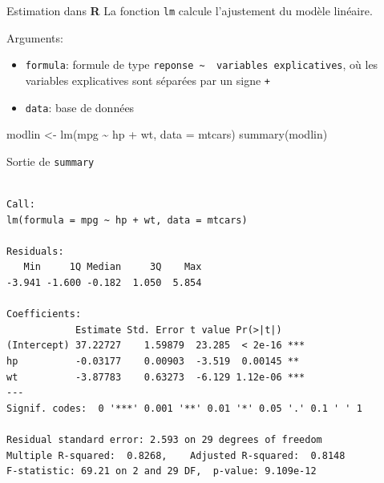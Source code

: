 \documentclass[
  ignorenonframetext,
]{beamer}
\newenvironment{Shaded}{\begin{snugshade}}{\end{snugshade}}
\newcommand{\AttributeTok}[1]{\textcolor[rgb]{0.40,0.45,0.13}{#1}}
\newcommand{\FunctionTok}[1]{\textcolor[rgb]{0.28,0.35,0.67}{#1}}
\newcommand{\NormalTok}[1]{\textcolor[rgb]{0.00,0.23,0.31}{#1}}
\newcommand{\OtherTok}[1]{\textcolor[rgb]{0.00,0.23,0.31}{#1}}
\newcommand{\SpecialCharTok}[1]{\textcolor[rgb]{0.37,0.37,0.37}{#1}}
\providecommand{\tightlist}{%
  \setlength{\itemsep}{0pt}\setlength{\parskip}{0pt}}\usepackage{longtable,booktabs,array}
\begin{document}
\begin{frame}[fragile]{Estimation dans \textbf{R}}
\label{estimation-dans-r}
La fonction \texttt{lm} calcule l'ajustement du modèle linéaire.

Arguments:

\begin{itemize}
\tightlist
\item
  \texttt{formula}: formule de type
  \texttt{reponse\ \textasciitilde{}\ \ variables\ explicatives}, où les
  variables explicatives sont séparées par un signe \texttt{+}
\item
  \texttt{data}: base de données
\end{itemize}

\begin{Shaded}
\begin{Highlighting}[numbers=left,,]
\NormalTok{modlin }\OtherTok{\textless{}{-}} \FunctionTok{lm}\NormalTok{(mpg }\SpecialCharTok{\textasciitilde{}}\NormalTok{ hp }\SpecialCharTok{+}\NormalTok{ wt, }
             \AttributeTok{data =}\NormalTok{ mtcars)}
\FunctionTok{summary}\NormalTok{(modlin)}
\end{Highlighting}
\end{Shaded}
\end{frame}

\begin{frame}[fragile]{Sortie de \texttt{summary}}
\label{sortie-de-summary}
\footnotesize

\begin{verbatim}

Call:
lm(formula = mpg ~ hp + wt, data = mtcars)

Residuals:
   Min     1Q Median     3Q    Max 
-3.941 -1.600 -0.182  1.050  5.854 

Coefficients:
            Estimate Std. Error t value Pr(>|t|)    
(Intercept) 37.22727    1.59879  23.285  < 2e-16 ***
hp          -0.03177    0.00903  -3.519  0.00145 ** 
wt          -3.87783    0.63273  -6.129 1.12e-06 ***
---
Signif. codes:  0 '***' 0.001 '**' 0.01 '*' 0.05 '.' 0.1 ' ' 1

Residual standard error: 2.593 on 29 degrees of freedom
Multiple R-squared:  0.8268,    Adjusted R-squared:  0.8148 
F-statistic: 69.21 on 2 and 29 DF,  p-value: 9.109e-12
\end{verbatim}

\normalsize
\end{frame}
\end{document}
